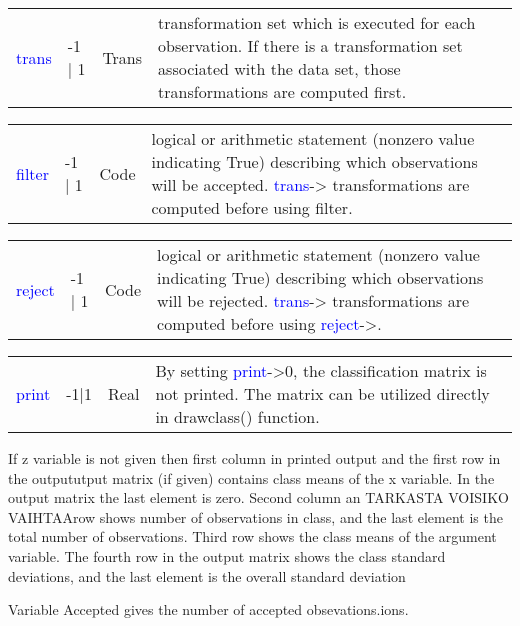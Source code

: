 \vspace{-1.51em}
\begin{table}[H]
\begin{tabular}{ m{}  m{}m{}p{}}
\textcolor{blue}{trans} &-1 | 1&Trans&	transformation set which is executed for each observation. If there is a transformation set associated with the data set, those transformations are computed first.
\\ \cline{1-4}
\end{tabular}
\end{table}
\vspace{-1.51em}
\begin{table}[H]
\begin{tabular}{ m{}  m{}m{}p{}}
\textcolor{blue}{filter} &-1 | 1&Code& logical or arithmetic statement (nonzero value indicating True) describing which observations will be accepted. \textcolor{blue}{trans}-> transformations are computed before using filter.
\\ \cline{1-4}
\end{tabular}
\end{table}
\vspace{-1.51em}
\begin{table}[H]
\begin{tabular}{ m{}  m{}m{}p{}}
\textcolor{blue}{reject} &-1 | 1&Code& logical or arithmetic statement (nonzero value indicating True) describing which observations will be rejected. \textcolor{blue}{trans}-> transformations are computed before using \textcolor{blue}{reject}->.

\\ \cline{1-4}
\end{tabular}
\end{table}
\vspace{-1.51em}
\begin{table}[H]
\begin{tabular}{ m{}  m{}m{}p{}}
 \textcolor{blue}{print}&-1|1&Real& By setting \textcolor{blue}{print}->0, the classification matrix is not printed.
  The matrix can be utilized directly in \textcolor{VioletRed}{drawclass}() function.
\\ \cline{1-4}
\end{tabular}
\end{table}
\begin{note}
If z variable is not given then first column in printed output and the first row in the outpututput
 matrix (if given) contains class means of the x variable. In the output matrix the last element is
 zero. Second column an TARKASTA VOISIKO VAIHTAArow shows number of observations in
 class, and the last element is the total number of observations. Third row shows the class means
 of the argument variable. The fourth row in the output matrix shows the class standard
 deviations, and the last element is the overall standard deviation
\end{note}
\begin{note}
Variable Accepted gives the number of accepted obsevations.ions.
\end{note}
